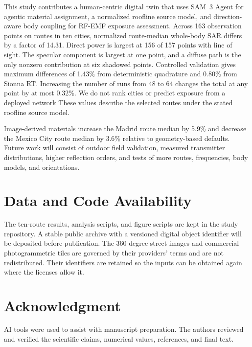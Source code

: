 \documentclass{IEEEoj}
\providecommand{\DIFadd}[1]{{\protect\color{blue} \sf #1}} %
\providecommand{\DIFdel}[1]{{\protect\color{red} \scriptsize #1}} %
\providecommand{\DIFaddbegin}{} %
\providecommand{\DIFaddend}{} %
\providecommand{\DIFdelbegin}{} %
\providecommand{\DIFdelend}{} %
\begin{document}
This study contributes a human-centric digital twin that uses SAM~3 Agent for
agentic material assignment, a normalized roofline source model, and
direction-aware body coupling for RF-EMF exposure assessment.
Across 163 observation points on routes in ten cities, normalized route-median
whole-body SAR differs by a factor of 14.31. Direct power is largest at 156 of
157 points with line of sight. The specular component is largest at one point, and a
diffuse path is the only nonzero contribution at six shadowed points. Controlled
validation gives maximum differences of 1.43\% from deterministic quadrature
and 0.80\% from Sionna RT. Increasing the number of runs from 48 to 64 changes
the total at any point by at most 0.32\%. \DIFdelbegin \DIFdel{We do not rank cities or predict
exposure from a deployed network}\DIFdelend \DIFaddbegin \DIFadd{These values describe the selected
routes under the stated roofline source model}\DIFaddend .

Image-derived materials increase the Madrid route median by 5.9\% and decrease
the Mexico City route median by 3.6\% relative to geometry-based defaults.
Future work will consist of outdoor field validation, measured transmitter
distributions, higher reflection orders, and tests of more routes, frequencies,
body models, and orientations.

\section*{Data and Code Availability}

The ten-route results, analysis scripts, and figure scripts are kept in the
study repository. A stable public archive with a versioned digital object
identifier will be deposited before publication. The 360-degree street images
and commercial photogrammetric tiles are governed by their providers' terms and
are not redistributed. Their identifiers are retained so the inputs can be
obtained again where the licenses allow it.

\section*{Acknowledgment}

AI tools were used to assist with manuscript preparation. The authors reviewed
and verified the scientific claims, numerical values, references, and final
text.
\end{document}
